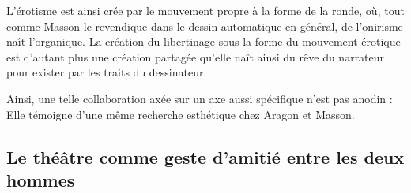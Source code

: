 	 L'érotisme est ainsi crée par le mouvement propre à la forme de la ronde, où, tout comme Masson le revendique dans le dessin automatique en général, de l'onirisme naît l'organique. La création du libertinage sous la forme du mouvement érotique est d'autant plus une création partagée qu'elle naît ainsi du rêve du narrateur pour exister par les traits du dessinateur. 
	 
	Ainsi, une telle collaboration axée sur un axe aussi spécifique n’est pas anodin : Elle témoigne d’une même recherche esthétique chez Aragon et Masson. 

\subsection{Le théâtre comme geste d'amitié entre les deux hommes}

